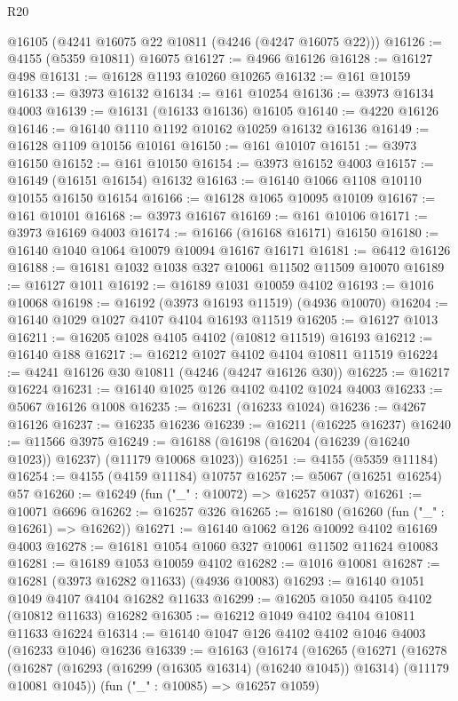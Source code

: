 \begin{lexlean}{R20}
\begin{coremodule}
    @16105
    (@4241 @16075 @22 @10811 (@4246 (@4247 @16075 @22)))
@16126 := @4155 (@5359 @10811) @16075
@16127 := @4966 @16126
@16128 := @16127 @498
@16131 := @16128 @1193 @10260 @10265
@16132 := @161 @10159
@16133 := @3973 @16132
@16134 := @161 @10254
@16136 := @3973 @16134 @4003
@16139 := @16131 (@16133 @16136) @16105
@16140 := @4220 @16126
@16146 := @16140 @1110 @1192 @10162 @10259 @16132 @16136
@16149 := @16128 @1109 @10156 @10161
@16150 := @161 @10107
@16151 := @3973 @16150
@16152 := @161 @10150
@16154 := @3973 @16152 @4003
@16157 := @16149 (@16151 @16154) @16132
@16163 := @16140 @1066 @1108 @10110 @10155 @16150 @16154
@16166 := @16128 @1065 @10095 @10109
@16167 := @161 @10101
@16168 := @3973 @16167
@16169 := @161 @10106
@16171 := @3973 @16169 @4003
@16174 := @16166 (@16168 @16171) @16150
@16180 := @16140 @1040 @1064 @10079 @10094 @16167 @16171
@16181 := @6412 @16126
@16188 := @16181 @1032 @1038 @327 @10061 @11502 @11509 @10070
@16189 := @16127 @1011
@16192 := @16189 @1031 @10059 @4102
@16193 := @1016 @10068
@16198 := @16192 (@3973 @16193 @11519) (@4936 @10070)
@16204 := @16140 @1029 @1027 @4107 @4104 @16193 @11519
@16205 := @16127 @1013
@16211 := @16205 @1028 @4105 @4102 (@10812 @11519) @16193
@16212 := @16140 @188
@16217 := @16212 @1027 @4102 @4104 @10811 @11519
@16224 := @4241 @16126 @30 @10811 (@4246 (@4247 @16126 @30))
@16225 := @16217 @16224
@16231 := @16140 @1025 @126 @4102 @4102 @1024 @4003
@16233 := @5067 @16126 @1008
@16235 := @16231 (@16233 @1024)
@16236 := @4267 @16126
@16237 := @16235 @16236
@16239 := @16211 (@16225 @16237)
@16240 := @11566 @3975
@16249 := @16188 (@16198 (@16204 (@16239 (@16240 @1023)) @16237) (@11179 @10068 @1023))
@16251 := @4155 (@5359 @11184)
@16254 := @4155 (@4159 @11184) @10757
@16257 := @5067 (@16251 @16254) @57
@16260 := @16249 (fun ("_" : @10072) => @16257 @1037)
@16261 := @10071 @6696
@16262 := @16257 @326
@16265 := @16180 (@16260 (fun ("_" : @16261) => @16262))
@16271 := @16140 @1062 @126 @10092 @4102 @16169 @4003
@16278 := @16181 @1054 @1060 @327 @10061 @11502 @11624 @10083
@16281 := @16189 @1053 @10059 @4102
@16282 := @1016 @10081
@16287 := @16281 (@3973 @16282 @11633) (@4936 @10083)
@16293 := @16140 @1051 @1049 @4107 @4104 @16282 @11633
@16299 := @16205 @1050 @4105 @4102 (@10812 @11633) @16282
@16305 := @16212 @1049 @4102 @4104 @10811 @11633 @16224
@16314 := @16140 @1047 @126 @4102 @4102 @1046 @4003 (@16233 @1046) @16236
@16339 := @16163
    (@16174
      (@16265
        (@16271
          (@16278
            (@16287 (@16293 (@16299 (@16305 @16314) (@16240 @1045)) @16314) (@11179 @10081 @1045))
            (fun ("_" : @10085) => @16257 @1059)

\end{coremodule}
\end{lexlean}
